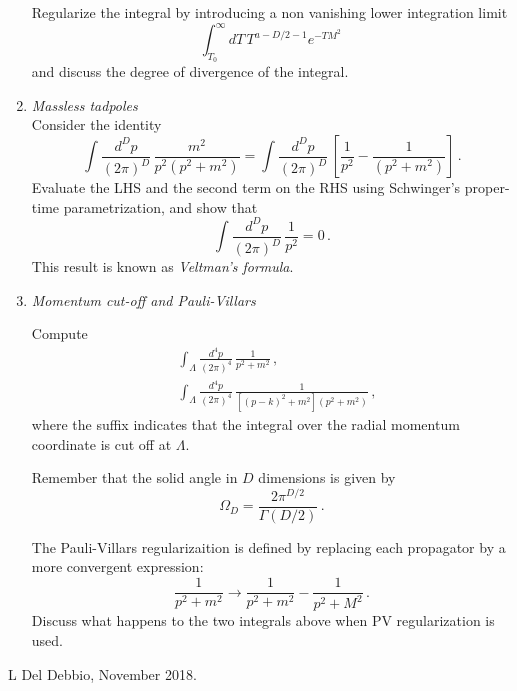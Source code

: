 \documentclass[12pt,a4paper]{article}
\begin{document}
\begin{enumerate}
  Regularize the integral by introducing a non vanishing lower
  integration limit
  \[
    \int_{T_0}^\infty dT\, T^{a-D/2-1} e^{-T M^2}\,
  \]
  and discuss the degree of divergence of the integral. 

\item \emph{ Massless tadpoles}\\

  Consider the identity
  \[
    \int \frac{d^Dp}{(2\pi)^D}\, \frac{m^2}{p^2(p^2+m^2)} =
    \int \frac{d^Dp}{(2\pi)^D}\, \left[
      \frac{1}{p^2} - \frac{1}{(p^2+m^2)}
    \right]\, .
  \]
  Evaluate the LHS and the second term on the RHS using Schwinger's
  proper-time parametrization, and show that
  \[
    \int \frac{d^Dp}{(2\pi)^D}\, \frac{1}{p^2} = 0\, .
  \]
  This result is known as {\em Veltman's formula}.

  \bigskip

  \item \emph{ Momentum cut-off and Pauli-Villars}

    Compute
    \begin{align*}
      &\int_\Lambda \frac{d^4p}{(2\pi)^4}\, \frac{1}{p^2+m^2}\, , \\
      &\int_\Lambda \frac{d^4p}{(2\pi)^4}\,
        \frac{1}{\left[(p-k)^2+m^2\right] \left(p^2+m^2\right)}\, ,
    \end{align*}
    where the suffix indicates that the integral over the radial
    momentum coordinate is cut off at $\Lambda$.

    Remember that the solid angle in $D$ dimensions is given by
    \[
      \Omega_D = \frac{2\pi^{D/2}}{\Gamma(D/2)}\, .
    \]
   
    The Pauli-Villars regularizaition is defined by replacing each
    propagator by a more convergent expression:
    \[
      \frac{1}{p^2+m^2} \longrightarrow
      \frac{1}{p^2+m^2} - \frac{1}{p^2+M^2} \, .
    \]
    Discuss what happens to the two integrals above when PV
    regularization is used. 
    
\end{enumerate}

\vfill
\hspace*{\fill}\tiny L Del Debbio, November 2018.
\end{document}
